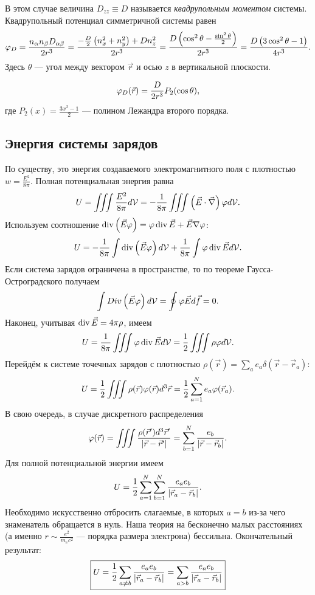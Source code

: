     В этом случае величина $D_{zz} \equiv D$ называется \textit{квадрупольным моментом} системы. Квадрупольный потенциал симметричной системы равен
    \begin{gather*}
        \varphi_D = \frac{n_{\alpha}n_{\beta}D_{\alpha\beta}}{2r^3} = \frac{-\frac D2 \left({n_x^2 + n_y^2}\right) + Dn_z^2}{2r^3} =
        \frac{D\left({\cos^2\theta - \frac{\sin^2\theta}{2}}\right)}{2r^3} = \frac{D\left({3\cos^2\theta - 1}\right)}{4r^3}.
    \end{gather*}
    Здесь $\theta$ --- угол между вектором $\vec{r}$ и осью $z$ в вертикальной плоскости.
    \begin{note}
        \[
            \varphi_D(\vec{r}) = \frac{D}{2r^3}P_2(\cos\theta),
        \]
        где $\displaystyle P_2(x) = \frac{3x^2 - 1}2$ --- полином Лежандра второго порядка.
    \end{note}

\subsection{Энергия системы зарядов}
    По существу, это энергия создаваемого электромагнитного поля с плотностью $w = \frac{E^2}{8\pi}$. Полная потенциальная энергия равна
    \[
        U = \iiint \frac{E^2}{8\pi}d\mathcal{V} = -\frac{1}{8\pi} \iiint \left({\vec{E}\cdot\vec{\nabla}}\right)\varphi d\mathcal{V}.
    \]
    Используем соотношение $\operatorname{div}\left({\vec{E}\varphi}\right) = \varphi\operatorname{div}\vec{E} + \vec{E}\nabla\varphi$:
    \[
        U = -\frac{1}{8\pi}\int\operatorname{div}\left({\vec{E}\varphi}\right) d\mathcal{V} + \frac{1}{8\pi}\int\varphi\operatorname{div}\vec{E}d\mathcal{V}.
    \]
    Если система зарядов ограничена в пространстве, то по теореме Гаусса-Остроградского получаем
    \[
        \int Div\left({\vec{E}\varphi}\right) d\mathcal{V} = \oint \varphi\vec{E}d\vec{f} = 0.
    \]
    Наконец, учитывая $\operatorname{div}\vec{E} = 4\pi\rho$, имеем
    \[
        U = \frac{1}{8\pi}\iiint\varphi\operatorname{div}\vec{E}d\mathcal{V} = \frac 12 \iiint \rho\varphi d\mathcal{V}.
    \]
    Перейдём к системе точечных зарядов с плотностью $\rho(\vec{r}) = \sum_ae_a\delta(\vec{r} - \vec{r}_a)$:
    \[
        U = \frac 12 \iiint \rho(\vec{r})\varphi(\vec{r})d^3\vec{r} = \frac 12 \sum_{a=1}^Ne_a\varphi(\vec{r}_a).
    \]
    В свою очередь, в случае дискретного распределения
    \[
        \varphi(\vec{r}) = \iiint\frac{\rho(\vec{r}')d^3\vec{r}'}{\left|{\vec{r} - \vec{r}'}\right|} = \sum_{b=1}^N\frac{e_b}{\left|{\vec{r} - \vec{r}_b}\right|}.
    \]
    Для полной потенциальной энергии имеем
    \[
        U = \frac 12 \sum_{a=1}^N\sum_{b=1}^N\frac{e_ae_b}{\left|{\vec{r}_a - \vec{r}_b}\right|}.
    \]
    Необходимо искусственно отбросить слагаемые, в которых $a = b$ из-за чего знаменатель обращается в нуль. Наша теория на бесконечно малых расстояниях
    (а именно $r \sim \frac{e^2}{m_ec^2}$ --- порядка размера электрона) бессильна. Окончательный результат:
    \[
        \boxed{U = \frac 12 \sum_{a \not= b} \frac{e_ae_b}{\left|{\vec{r}_a - \vec{r}_b}\right|} = \sum_{a>b}\frac{e_ae_b}{\left|{\vec{r}_a - \vec{r}_b}\right|}}
    \]

